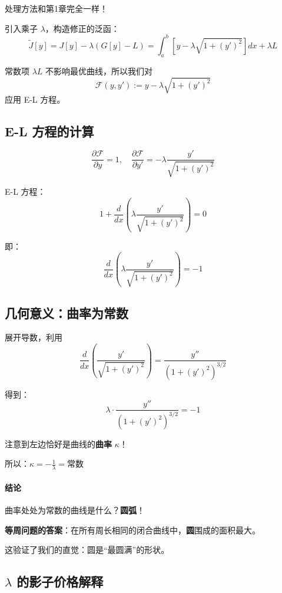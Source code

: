 处理方法和第1章完全一样！

引入乘子 $\lambda$，构造修正的泛函：
\[
\tilde{J}[y] = J[y] - \lambda (G[y] - L) = \int_a^b \left[ y - \lambda \sqrt{1 + (y')^2} \right] dx + \lambda L
\]

常数项 $\lambda L$ 不影响最优曲线，所以我们对
\[
\mathcal{F}(y, y') := y - \lambda \sqrt{1 + (y')^2}
\]
应用 E-L 方程。

\subsection{E-L 方程的计算}

\[
\frac{\partial \mathcal{F}}{\partial y} = 1, \quad
\frac{\partial \mathcal{F}}{\partial y'} = -\lambda \frac{y'}{\sqrt{1 + (y')^2}}
\]

E-L 方程：
\[
1 + \frac{d}{dx}\left( \lambda \frac{y'}{\sqrt{1 + (y')^2}} \right) = 0
\]

即：
\[
\frac{d}{dx}\left( \lambda \frac{y'}{\sqrt{1 + (y')^2}} \right) = -1
\]

\subsection{几何意义：曲率为常数}

展开导数，利用
\[
\frac{d}{dx}\left( \frac{y'}{\sqrt{1+(y')^2}} \right) = \frac{y''}{(1+(y')^2)^{3/2}}
\]

得到：
\[
\lambda \cdot \frac{y''}{(1+(y')^2)^{3/2}} = -1
\]


注意到左边恰好是曲线的\textbf{曲率} $\kappa$！

所以：$\kappa = -\frac{1}{\lambda} = \text{常数}$

\paragraph{结论}

曲率处处为常数的曲线是什么？\textbf{圆弧}！

\begin{insightbox}
\textbf{等周问题的答案}：在所有周长相同的闭合曲线中，\textbf{圆}围成的面积最大。

这验证了我们的直觉：圆是“最圆满”的形状。
\end{insightbox}

\subsection{$\lambda$ 的影子价格解释}

